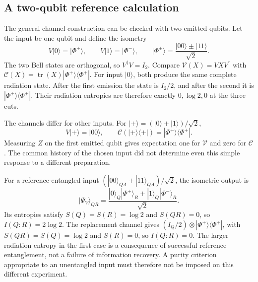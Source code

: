 \documentclass[11pt,letterpaper]{article}
\theoremstyle{plain}
\theoremstyle{definition}
\theoremstyle{remark}
\DeclareMathOperator{\tr}{tr}
\begin{document}
\subsection{A two-qubit reference calculation}
\label{subsec14:qubit_reference}

The general channel construction can be checked with two emitted qubits.
Let the input be one qubit and define the isometry
\begin{equation}
 V|0\rangle=|\Phi^+\rangle,
 \qquad V|1\rangle=|\Phi^-\rangle,
 \qquad |\Phi^\pm\rangle=\frac{|00\rangle\pm|11\rangle}{\sqrt2}.
 \label{eq14:qubit_isometry}
\end{equation}
The two Bell states are orthogonal, so $V^\dagger V=I_2$.
Compare $\mathcal V(X)=VXV^\dagger$ with
$\mathcal C(X)=\tr(X)|\Phi^+\rangle\langle\Phi^+|$.
For input $|0\rangle$, both produce the same complete radiation state.
After the first emission the state is $I_2/2$, and after the second it
is $|\Phi^+\rangle\langle\Phi^+|$. Their radiation entropies are
therefore exactly $0,\log2,0$ at the three cuts.

The channels differ for other inputs. For
$|+\rangle=(|0\rangle+|1\rangle)/\sqrt2$,
\begin{equation}
 V|+\rangle=|00\rangle,
 \qquad \mathcal C(|+\rangle\langle+|)
       =|\Phi^+\rangle\langle\Phi^+|.
 \label{eq14:qubit_other_input}
\end{equation}
Measuring $Z$ on the first emitted qubit gives expectation one for
$\mathcal V$ and zero for $\mathcal C$. The common history of the
chosen input did not determine even this simple response to a different
preparation.

For a reference-entangled input
$(|00\rangle_{QA}+|11\rangle_{QA})/\sqrt2$, the isometric output is
\begin{equation}
 |\Psi_V\rangle_{QR}
 =\frac{|0\rangle_Q|\Phi^+\rangle_R
             +|1\rangle_Q|\Phi^-\rangle_R}{\sqrt2}.
 \label{eq14:qubit_reference_state}
\end{equation}
Its entropies satisfy $S(Q)=S(R)=\log2$ and $S(QR)=0$, so
$I(Q:R)=2\log2$. The replacement channel gives
$(I_Q/2)\otimes|\Phi^+\rangle\langle\Phi^+|$, with
$S(QR)=S(Q)=\log2$ and $S(R)=0$, so $I(Q:R)=0$.
The larger radiation entropy in the first case is a consequence of
successful reference entanglement, not a failure of information
recovery. A purity criterion appropriate to an unentangled input must
therefore not be imposed on this different experiment.
\end{document}
